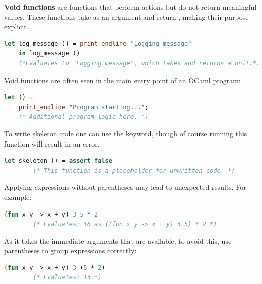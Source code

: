 \newpage

\begin{Def}

\label{def:void}
\textbf{Void functions} are functions that perform actions but do not return meaningful values. 
These functions take  as an argument and return , making their purpose explicit.

\begin{lstlisting}[language=OCaml, caption={Void Function Example}, numbers=none]
    let log_message () = print_endline "Logging message" 
    in log_message ()
    (*Evaluates to "Logging message", which takes and returns a unit.*)
\end{lstlisting}

\noindent
Void functions are often seen in the main entry point of an OCaml program:
\begin{lstlisting}[language=OCaml, caption={Using \snippet{let ()} in the Main Function}, numbers=none]
    let () =
    print_endline "Program starting...";
    (* Additional program logic here. *)
\end{lstlisting}
\end{Def}

\begin{Def}
    
    To write skeleton code one can use the  keyword, though of course running this function will result in an error.

    \begin{lstlisting}[language=OCaml, caption={Skeleton Code Example}, numbers=none]
        let skeleton () = assert false
        (* This function is a placeholder for unwritten code. *)
    \end{lstlisting}

\noindent
\end{Def}

\begin{Def}

    Applying expressions without parentheses may lead to unexpected results. For example:

    \begin{lstlisting}[language=OCaml, caption={Incorrect Function Application}, numbers=none]
        (fun x y -> x + y) 3 5 * 2
        (* Evaluates: 16 as ((fun x y -> x + y) 3 5) * 2 *)
    \end{lstlisting}
    \noindent
    As it takes the immediate arguments that are available, to avoid this, use parentheses to group expressions correctly:
    \begin{lstlisting}[language=OCaml, caption={Correct Function Application}, numbers=none]
        (fun x y -> x + y) 3 (5 * 2)
        (* Evaluates: 13 *)
    \end{lstlisting}
\end{Def}


